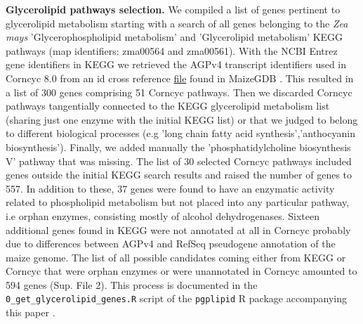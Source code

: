 \documentclass[9pt,twocolumn,twoside,lineno]{biorxiv}
\begin{document}
\textbf{Glycerolipid pathways selection.}
We compiled a list of genes pertinent to glycerolipid metabolism starting with a search of all genes belonging to the \textit{Zea mays} 'Glycerophospholipid metabolism' and 'Glycerolipid metabolism' KEGG pathways \cite{kanehisa2019} (map identifiers: zma00564 and zma00561). 
With the NCBI Entrez gene identifiers in KEGG we retrieved the AGPv4 transcript identifiers used in Corncyc 8.0 \cite{portwood2019, walsh2016} from an id cross reference \href{https://www.maizegdb.org/search/gene/download_gene_xrefs.php?relative=v4}{file} found in MaizeGDB   \cite{portwood2019}.
This resulted in a list of 300 genes comprising 51 Corncyc pathways. 
Then we discarded Corncyc pathways  tangentially connected to the KEGG glycerolipid metabolism list (sharing just one enzyme with the initial KEGG list) or that we judged to belong to different biological processes (e.g 'long chain fatty acid synthesis','anthocyanin biosynthesis'). 
Finally, we added manually the 'phosphatidylcholine biosynthesis V' pathway that was missing. 
The list of 30 selected Corncyc pathways included genes outside the initial KEGG search results and raised the number of genes to 557. 
In addition to these, 37 genes were found to have an enzymatic activity related to phospholipid metabolism but not placed into any particular pathway, i.e orphan enzymes, consisting mostly of alcohol dehydrogenases. 
Sixteen additional genes found in KEGG were not annotated at all in Corncyc probably due to differences between AGPv4 and RefSeq pseudogene annotation of the maize genome. 
The list of all possible candidates coming either from KEGG or Corncyc that were orphan enzymes or were unannotated in Corncyc amounted to 594 genes (Sup. File 2). 
This process is documented in the \verb|0_get_glycerolipid_genes.R| script of the \verb|pgplipid| R package accompanying this paper \cite{fausto_rodriguez_zapata_2020_4323410}.
\end{document}
